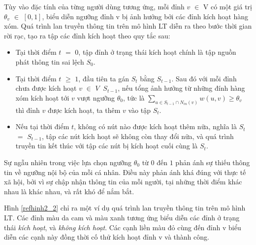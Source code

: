 	Tùy vào đặc tính của từng người dùng tương ứng, mỗi đỉnh $v$ $\in$ V có một giá trị $\theta$$_{v}$ $\in$ $[0,1]$, biểu diễn ngưỡng đỉnh v bị ảnh hưởng bởi các đỉnh kích hoạt hàng xóm. Quá trình lan truyền thông tin trên mô hình LT diễn ra theo bước thời gian rời rạc, tạo ra tập các đỉnh kích hoạt theo quy tắc sau:
	\begin {itemize}
		\item Tại thời điểm $t$ $=$ $0$, tập đỉnh ở trạng thái kích hoạt chính là tập nguồn phát thông tin sai lệch $S$$_{0}$.
	
		\item Tại thời điểm $t$ $\geq$ $1$, đầu tiên ta gán $S$$_{t}$ bằng $S$$_{t-1}$. Sau đó với mỗi đỉnh chưa được kích hoạt $v$ $\in$ $V$ $\ S_{t-1}$, nếu tổng ảnh hưởng từ những đính hàng xóm kích hoạt tới $v$ vượt ngưỡng $\theta$$_{0}$, tức là  $\sum_{u\in S_{t-1} \cap N_{in}(v)}w(u,v) \geq \theta_{v}$ thì đỉnh $v$ được kích hoạt, ta thêm $v$ vào tập $S$$_{t}$.
	
		\item Nếu tại thời điểm $t$, không có nút nào được kích hoạt thêm nữa, nghĩa là $S$$_{t}$ $=$ $S$$_{t-1}$, tập các nút kích hoạt sẽ không còn thay đổi nữa, và quá trình truyền tin kết thúc với tập các nút bị kích hoạt cuối cùng là $S$$_{t}$.
	\end {itemize}
	Sự ngẫu nhiên trong việc lựa chọn ngưỡng $\theta$$_{0}$ từ $0$ đến $1$ phản ánh sự thiếu thông tin về ngưỡng nội bộ của mỗi cá nhân. Điều này phản ánh khá đúng với thực tế xã hội, bởi vì sự chập nhận thông tin của mỗi người, tại những thời điểm khác nhau là khác nhau, và rất khó để nắm bắt. 
	
	Hình \ref{refhinh2_2} chỉ ra một ví dụ quá trình lan truyền thông tin trên mô hình LT. Các đỉnh màu da cam và màu xanh tương ứng biểu diễn các đỉnh ở trạng thái {\itshape kích hoạt}, và {\itshape không kích hoạt}. Các cạnh liền màu đỏ cùng đến đỉnh v biểu diễn các cạnh này đồng thời cố thử kích hoạt đỉnh v và thành công.
	
